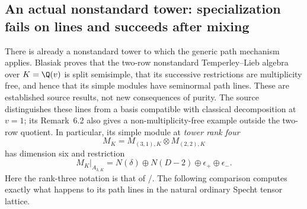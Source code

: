 \subsection{An actual nonstandard tower: specialization fails on lines and succeeds after mixing}
There is already a nonstandard tower to which the generic path mechanism
applies. Blasiak \cite[Theorem~5.1, p.~14; Proposition~5.2, pp.~14--15;
Definition~6.1, p.~23]{BlasiakRep} proves that the two-row nonstandard
Temperley--Lieb algebra over $K=\Q(v)$ is split semisimple, that its
successive restrictions are multiplicity free, and hence that its simple
modules have seminormal path lines. These are established source results,
not new consequences of purity. The source distinguishes these lines
from a basis compatible with classical decomposition at $v=1$; its
Remark~6.2 also gives a non-multiplicity-free example outside the
two-row quotient. In particular, its simple module at \emph{tower rank
four}
\[
 M_K=M_{(3,1),K}\otimes M_{(2,2),K}
\]
has dimension six and restriction
\begin{equation}\label{eq:towerrestriction}
 M_K|_{A_{3,K}}=N(\delta)\oplus N(D-2)\oplus\epsilon_+
                  \oplus\epsilon_-.
\end{equation}
Here the rank-three notation is that of /.
The following comparison computes exactly what happens to its path lines
in the natural ordinary Specht tensor lattice.


